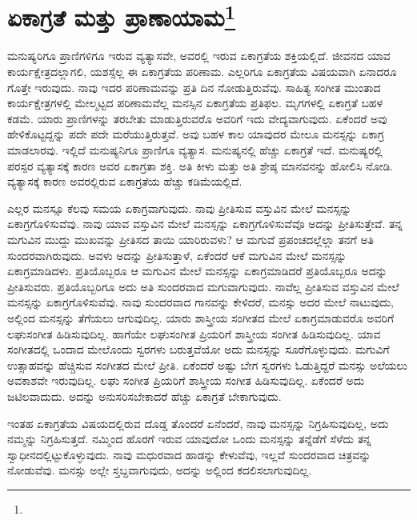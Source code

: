 
\chapter[ಏಕಾಗ್ರತೆ ಮತ್ತು ಪ್ರಾಣಾಯಾಮ]{ಏಕಾಗ್ರತೆ ಮತ್ತು ಪ್ರಾಣಾಯಾಮ\protect\footnote{}}

ಮನುಷ್ಯರಿಗೂ ಪ್ರಾಣಿಗಳಿಗೂ ಇರುವ ವ್ಯತ್ಯಾಸವೇ, ಅವರಲ್ಲಿ ಇರುವ ಏಕಾಗ್ರತೆಯ ಶಕ್ತಿಯಲ್ಲಿದೆ. ಜೀವನದ ಯಾವ ಕಾರ್ಯಕ್ಷೇತ್ರದಲ್ಲಾಗಲಿ, ಯಶಸ್ಸೆಲ್ಲ ಈ ಏಕಾಗ್ರತೆಯ ಪರಿಣಾಮ. ಎಲ್ಲರಿಗೂ ಏಕಾಗ್ರತೆಯ ವಿಷಯವಾಗಿ ಏನಾದರೂ ಗೊತ್ತೇ ಇರುವುದು. ನಾವು ಇದರ ಪರಿಣಾಮವನ್ನು ಪ್ರತಿ ದಿನ ನೋಡುತ್ತಿರುವೆವು. ಸಾಹಿತ್ಯ ಸಂಗೀತ ಮುಂತಾದ ಕಾರ್ಯಕ್ಷೇತ್ರಗಳಲ್ಲಿ ಮೇಲ್ಮಟ್ಟದ ಪರಿಣಾಮವೆಲ್ಲ ಮನಸ್ಸಿನ ಏಕಾಗ್ರತೆಯ ಪ್ರತಿಫಲ. ಮೃಗಗಳಲ್ಲಿ ಏಕಾಗ್ರತೆ ಬಹಳ ಕಡಮೆ. ಯಾರು ಪ್ರಾಣಿಗಳನ್ನು ತರಬೇತು ಮಾಡುತ್ತಿರುವರೊ ಅವರಿಗೆ ಇದು ವೇದ್ಯವಾಗುವುದು. ಏಕೆಂದರೆ ಅವು ಹೇಳಿಕೊಟ್ಟದ್ದನ್ನು ಪದೇ ಪದೇ ಮರೆಯುತ್ತಿರುತ್ತವೆ. ಅವು ಬಹಳ ಕಾಲ ಯಾವುದರ ಮೇಲೂ ಮನಸ್ಸನ್ನು ಏಕಾಗ್ರ ಮಾಡಲಾರವು. ಇಲ್ಲಿದೆ ಮನುಷ್ಯನಿಗೂ ಪ್ರಾಣಿಗೂ ವ್ಯತ್ಯಾಸ. ಮನುಷ್ಯನಲ್ಲಿ ಹೆಚ್ಚು ಏಕಾಗ್ರತೆ ಇದೆ. ಮನುಷ್ಯರಲ್ಲಿ ಪರಸ್ಪರ ವ್ಯತ್ಯಾಸಕ್ಕೆ ಕಾರಣ ಅವರ ಏಕಾಗ್ರತಾ ಶಕ್ತಿ. ಅತಿ ಕೀಳು ಮತ್ತು ಅತಿ ಶ್ರೇಷ್ಠ ಮಾನವನನ್ನು ಹೋಲಿಸಿ ನೋಡಿ. ವ್ಯತ್ಯಾಸಕ್ಕೆ ಕಾರಣ ಅವರಲ್ಲಿರುವ ಏಕಾಗ್ರತೆಯ ಹೆಚ್ಚು ಕಡಿಮೆಯಲ್ಲಿದೆ.

ಎಲ್ಲರ ಮನಸ್ಸೂ ಕೆಲವು ಸಮಯ ಏಕಾಗ್ರವಾಗುವುದು. ನಾವು ಪ್ರೀತಿಸುವ ವಸ್ತುವಿನ ಮೇಲೆ ಮನಸ್ಸನ್ನು ಏಕಾಗ್ರಗೊಳಿಸುವೆವು. ನಾವು ಯಾವ ವಸ್ತುವಿನ ಮೇಲೆ ಮನಸ್ಸನ್ನು ಏಕಾಗ್ರಗೊಳಿಸುವೆವೊ ಅದನ್ನು ಪ್ರೀತಿಸುತ್ತೇವೆ. ತನ್ನ ಮಗುವಿನ ಮುದ್ದು ಮುಖವನ್ನು ಪ್ರೀತಿಸದ ತಾಯಿ ಯಾರಿರುವಳು? ಆ ಮಗುವೆ ಪ್ರಪಂಚದಲ್ಲೆಲ್ಲಾ ತನಗೆ ಅತಿ ಸುಂದರವಾಗಿರುವುದು. ಅವಳು ಅದನ್ನು ಪ್ರೀತಿಸುತ್ತಾಳೆ, ಏಕೆಂದರೆ ಆಕೆ ಮಗುವಿನ ಮೇಲೆ ಮನಸ್ಸನ್ನು ಏಕಾಗ್ರಮಾಡಿದಳು. ಪ್ರತಿಯೊಬ್ಬರೂ ಆ ಮಗುವಿನ ಮೇಲೆ ಮನಸ್ಸನ್ನು ಏಕಾಗ್ರಮಾಡಿದರೆ ಪ್ರತಿಯೊಬ್ಬರೂ ಅದನ್ನು ಪ್ರೀತಿಸುವರು. ಪ್ರತಿಯೊಬ್ಬರಿಗೂ ಅದು ಅತಿ ಸುಂದರವಾದ ಮಗುವಾಗುವುದು. ನಾವೆಲ್ಲ ಪ್ರೀತಿಸುವ ವಸ್ತುವಿನ ಮೇಲೆ ಮನಸ್ಸನ್ನು ಏಕಾಗ್ರಗೊಳಿಸುವೆವು. ನಾವು ಸುಂದರವಾದ ಗಾನವನ್ನು ಕೇಳಿದರೆ, ಮನಸ್ಸು ಅದರ ಮೇಲೆ ನಾಟುವುದು, ಅಲ್ಲಿಂದ ಮನಸ್ಸನ್ನು ತೆಗೆಯಲು ಆಗುವುದಿಲ್ಲ. ಯಾರು ಶಾಸ್ತ್ರೀಯ ಸಂಗೀತದ ಮೇಲೆ ಏಕಾಗ್ರಮಾಡುವರೊ ಅವರಿಗೆ ಲಘುಸಂಗೀತ ಹಿಡಿಸುವುದಿಲ್ಲ. ಹಾಗೆಯೇ ಲಘುಸಂಗೀತ ಪ್ರಿಯರಿಗೆ ಶಾಸ್ತ್ರೀಯ ಸಂಗೀತ ಹಿಡಿಸುವುದಿಲ್ಲ. ಯಾವ ಸಂಗೀತದಲ್ಲಿ ಒಂದಾದ ಮೇಲೊಂದು ಸ್ವರಗಳು ಬರುತ್ತವೆಯೋ ಅದು ಮನಸ್ಸನ್ನು ಸೂರೆಗೊಳ್ಳುವುದು. ಮಗುವಿಗೆ ಉತ್ಸಾಹವನ್ನು ಹೆಚ್ಚಿಸುವ ಸಂಗೀತದ ಮೇಲೆ ಪ್ರೀತಿ. ಏಕೆಂದರೆ ಅಷ್ಟು ಬೇಗ ಸ್ವರಗಳು ಓಡುತ್ತಿದ್ದರೆ ಮನಸ್ಸು ಅಲೆಯಲು ಅವಕಾಶವೇ ಇರುವುದಿಲ್ಲ. ಲಘು ಸಂಗೀತ ಪ್ರಿಯರಿಗೆ ಶಾಸ್ತ್ರೀಯ ಸಂಗೀತ ಹಿಡಿಸುವುದಿಲ್ಲ. ಏಕೆಂದರೆ ಅದು ಜಟಿಲವಾದುದು. ಅದನ್ನು ಅನುಸರಿಸಬೇಕಾದರೆ ಹೆಚ್ಚು ಏಕಾಗ್ರತೆ ಬೇಕಾಗುವುದು.

ಇಂತಹ ಏಕಾಗ್ರತೆಯ ವಿಷಯದಲ್ಲಿರುವ ದೊಡ್ಡ ತೊಂದರೆ ಏನೆಂದರೆ, ನಾವು ಮನಸ್ಸನ್ನು ನಿಗ್ರಹಿಸುವುದಿಲ್ಲ, ಅದು ನಮ್ಮನ್ನು ನಿಗ್ರಹಿಸುತ್ತದೆ. ನಮ್ಮಿಂದ ಹೊರಗೆ ಇರುವ ಯಾವುದೋ ಒಂದು ಮನಸ್ಸನ್ನು ತನ್ನೆಡೆಗೆ ಸೆಳೆದು ತನ್ನ ಸ್ವಾಧೀನದಲ್ಲಿಟ್ಟುಕೊಳ್ಳುವುದು. ನಾವು ಮಧುರವಾದ ಹಾಡನ್ನು ಕೇಳುವೆವು, ಇಲ್ಲವೆ ಸುಂದರವಾದ ಚಿತ್ರವನ್ನು ನೋಡುವೆವು. ಮನಸ್ಸು ಅಲ್ಲೇ ಸ್ತಬ್ದವಾಗುವುದು, ಅದನ್ನು ಅಲ್ಲಿಂದ ಕದಲಿಸಲಾಗುವುದಿಲ್ಲ.

